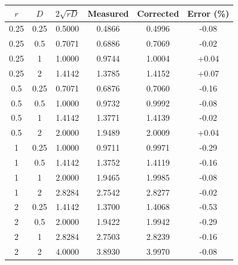 \begin{tabular}{cccccc}
\toprule
$r$ & $D$ & $2\sqrt{rD}$ & Measured & Corrected & Error (\%) \\
\midrule
0.25 & 0.25 & 0.5000 & 0.4866 & 0.4996 & -0.08 \\
0.25 & 0.5 & 0.7071 & 0.6886 & 0.7069 & -0.02 \\
0.25 & 1 & 1.0000 & 0.9744 & 1.0004 & +0.04 \\
0.25 & 2 & 1.4142 & 1.3785 & 1.4152 & +0.07 \\
0.5 & 0.25 & 0.7071 & 0.6876 & 0.7060 & -0.16 \\
0.5 & 0.5 & 1.0000 & 0.9732 & 0.9992 & -0.08 \\
0.5 & 1 & 1.4142 & 1.3771 & 1.4139 & -0.02 \\
0.5 & 2 & 2.0000 & 1.9489 & 2.0009 & +0.04 \\
1 & 0.25 & 1.0000 & 0.9711 & 0.9971 & -0.29 \\
1 & 0.5 & 1.4142 & 1.3752 & 1.4119 & -0.16 \\
1 & 1 & 2.0000 & 1.9465 & 1.9985 & -0.08 \\
1 & 2 & 2.8284 & 2.7542 & 2.8277 & -0.02 \\
2 & 0.25 & 1.4142 & 1.3700 & 1.4068 & -0.53 \\
2 & 0.5 & 2.0000 & 1.9422 & 1.9942 & -0.29 \\
2 & 1 & 2.8284 & 2.7503 & 2.8239 & -0.16 \\
2 & 2 & 4.0000 & 3.8930 & 3.9970 & -0.08 \\
\bottomrule
\end{tabular}
